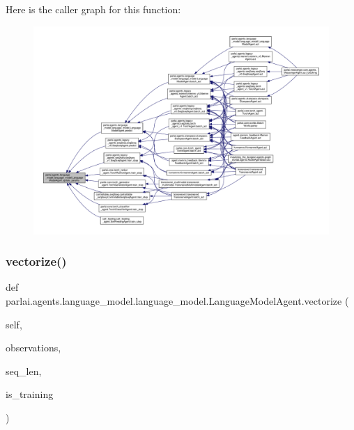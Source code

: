 Here is the caller graph for this function\+:
\nopagebreak
\begin{figure}[H]
\begin{center}
\leavevmode
\includegraphics[width=350pt]{classparlai_1_1agents_1_1language__model_1_1language__model_1_1LanguageModelAgent_af474c46339e2e0c881f8b8b81f5f9b7f_icgraph}
\end{center}
\end{figure}
\mbox{\label{classparlai_1_1agents_1_1language__model_1_1language__model_1_1LanguageModelAgent_aeddf3a4b207e0668644ce6dfd93f39ef}} 
\subsubsection{\texorpdfstring{vectorize()}{vectorize()}}
{\footnotesize\ttfamily def parlai.\+agents.\+language\+\_\+model.\+language\+\_\+model.\+Language\+Model\+Agent.\+vectorize (\begin{DoxyParamCaption}\item[{}]{self,  }\item[{}]{observations,  }\item[{}]{seq\+\_\+len,  }\item[{}]{is\+\_\+training }\end{DoxyParamCaption})}

